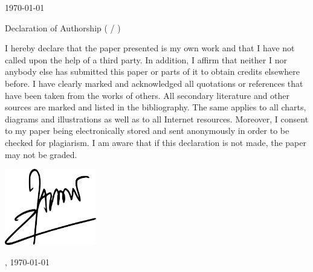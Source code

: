 \documentclass[
    12pt                                %
    ]{article}
\begin{document}
\begin{titlepage}
\begin{center}

{\LARGE \EMBACourse}

\vspace{0.5cm}
{\Large \EMBALecturer}

\vspace{1cm}
{\EMBAAssignmentType}

\vspace{0.5cm}
{\EMBAParticipant}

\vspace{0.5cm}
{\EMBAClass}

\vspace{1cm}
\today


\vspace{2.5cm}

Declaration of Authorship ({\EMBACourse} / \EMBAAssignmentType)
\vspace{0.5cm}
\end{center}


I hereby declare that the paper presented is my own work and that I
have not called upon the help of a third party. In addition, I affirm
that neither I nor anybody else has submitted this paper or parts of
it to obtain credits elsewhere before. I have clearly marked and
acknowledged all quotations or references that have been taken from
the works of others. All secondary literature and other sources are
marked and listed in the bibliography. The same applies to all charts,
diagrams and illustrations as well as to all Internet
resources. Moreover, I consent to my paper being electronically stored
and sent anonymously in order to be checked for plagiarism.  I am
aware that if this declaration is not made, the paper may not be
graded.

\vspace{1cm}

\begin{center}
\includegraphics[width=4cm] {img/signature.png}
\vspace{.1cm}

{\EMBAParticipant}

{\EMBALocation, \today}

\end{center}

\end{titlepage}
\end{document}
